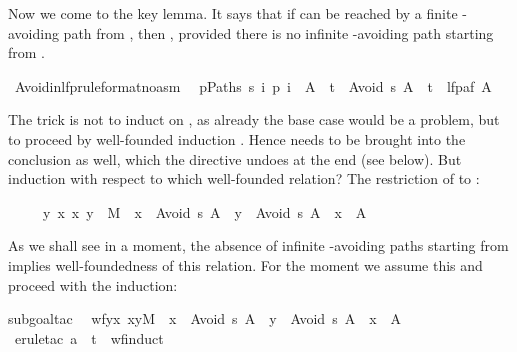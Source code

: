 \begin{isabellebody}
\begin{isamarkuptext}
Now we come to the key lemma. It says that if  can be reached by a
finite -avoiding path from , then ,
provided there is no infinite -avoiding path starting from .%
\end{isamarkuptext}%
\ Avoid{\isacharunderscore}in{\isacharunderscore}lfp{\isacharbrackleft}rule{\isacharunderscore}format{\isacharparenleft}no{\isacharunderscore}asm{\isacharparenright}{\isacharbrackright}{\isacharcolon}\isanewline
\ \ {\isachardoublequote}{\isasymforall}p{\isasymin}Paths\ s{\isachardot}\ {\isasymexists}i{\isachardot}\ p\ i\ {\isasymin}\ A\ {\isasymLongrightarrow}\ t\ {\isasymin}\ Avoid\ s\ A\ {\isasymlongrightarrow}\ t\ {\isasymin}\ lfp{\isacharparenleft}af\ A{\isacharparenright}{\isachardoublequote}%
\begin{isamarkuptxt}%
\noindent
The trick is not to induct on , as already the base
case would be a problem, but to proceed by well-founded induction . Hence  needs to be brought into the conclusion as
well, which the directive  undoes at the end (see below).
But induction with respect to which well-founded relation? The restriction
of  to :
\begin{isabelle}%
\ \ \ \ \ {\isacharbraceleft}{\isacharparenleft}y{\isacharcomma}\ x{\isacharparenright}{\isachardot}\ {\isacharparenleft}x{\isacharcomma}\ y{\isacharparenright}\ {\isasymin}\ M\ {\isasymand}\ x\ {\isasymin}\ Avoid\ s\ A\ {\isasymand}\ y\ {\isasymin}\ Avoid\ s\ A\ {\isasymand}\ x\ {\isasymnotin}\ A{\isacharbraceright}%
\end{isabelle}
As we shall see in a moment, the absence of infinite -avoiding paths
starting from  implies well-foundedness of this relation. For the
moment we assume this and proceed with the induction:%
\end{isamarkuptxt}%
subgoal{\isacharunderscore}tac\isanewline
\ \ {\isachardoublequote}wf{\isacharbraceleft}{\isacharparenleft}y{\isacharcomma}x{\isacharparenright}{\isachardot}\ {\isacharparenleft}x{\isacharcomma}y{\isacharparenright}{\isasymin}M\ {\isasymand}\ x\ {\isasymin}\ Avoid\ s\ A\ {\isasymand}\ y\ {\isasymin}\ Avoid\ s\ A\ {\isasymand}\ x\ {\isasymnotin}\ A{\isacharbraceright}{\isachardoublequote}{\isacharparenright}\isanewline
\ erule{\isacharunderscore}tac\ a\ {\isacharequal}\ t\ \ wf{\isacharunderscore}induct{\isacharparenright}\isanewline

\end{isabellebody}
